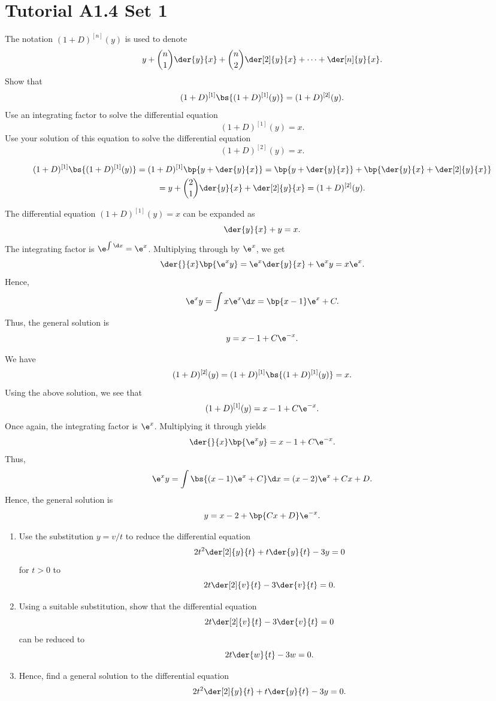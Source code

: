 \section{Tutorial A1.4 Set 1}

\begin{problem}
    The notation $(1 + D)^{[n]}(y)$ is used to denote \[y + \binom{n}{1} \der{y}{x} + \binom{n}{2} \der[2]{y}{x} + \dots + \der[n]{y}{x}.\] Show that \[(1 + D)^{[1]} \bs{(1 + D)^{[1]} (y)} = (1 + D)^{[2]} (y).\] Use an integrating factor to solve the differential equation \[(1 + D)^{[1]}(y) = x.\] Use your solution of this equation to solve the differential equation \[(1 + D)^{[2]}(y) = x.\]
\end{problem}
\begin{solution}
    \begin{gather*}
        (1 + D)^{[1]} \bs{(1 + D)^{[1]} (y)} = (1 + D)^{[1]} \bp{y + \der{y}{x}} = \bp{y + \der{y}{x}} + \bp{\der{y}{x} + \der[2]{y}{x}}\\
        = y + \binom{2}{1} \der{y}{x} + \der[2]{y}{x} = (1 + D)^{[2]} (y).
    \end{gather*}

    The differential equation $(1 + D)^{[1]}(y) = x$ can be expanded as \[\der{y}{x} + y = x.\] The integrating factor is $\e^{\int \d x} = \e^x$. Multiplying through by $\e^x$, we get \[\der{}{x} \bp{\e^x y} = \e^x \der{y}{x} + \e^x y = x \e^x.\] Hence, \[\e^x y = \int x \e^x \d x = \bp{x-1} \e^x + C.\] Thus, the general solution is \[y = x - 1 + C\e^{-x}.\]

    We have \[(1 + D)^{[2]}(y) = (1 + D)^{[1]} \bs{(1 + D)^{[1]} (y)} = x.\] Using the above solution, we see that \[(1 + D)^{[1]}(y) = x - 1 + C\e^{-x}.\] Once again, the integrating factor is $\e^x$. Multiplying it through yields \[\der{}{x} \bp{\e^x y} = x - 1 + C\e^{-x}.\] Thus, \[\e^x y = \int \bs{(x-1)\e^x + C} \d x = (x-2)\e^x + Cx + D.\] Hence, the general solution is \[y = x-2 + \bp{Cx + D} \e^{-x}.\]
\end{solution}

\clearpage
\begin{problem}
    \begin{enumerate}
        \item Use the substitution $y = v/t$ to reduce the differential equation \[2t^2 \der[2]{y}{t} + t\der{y}{t} - 3y = 0\] for $t > 0$ to \[2t\der[2]{v}{t} - 3\der{v}{t} = 0.\]
        \item Using a suitable substitution, show that the differential equation \[2t\der[2]{v}{t} - 3\der{v}{t} = 0\] can be reduced to \[2t \der{w}{t} - 3w = 0.\]
        \item Hence, find a general solution to the differential equation \[2t^2 \der[2]{y}{t} + t\der{y}{t} - 3y = 0.\]
    \end{enumerate}
\end{problem}